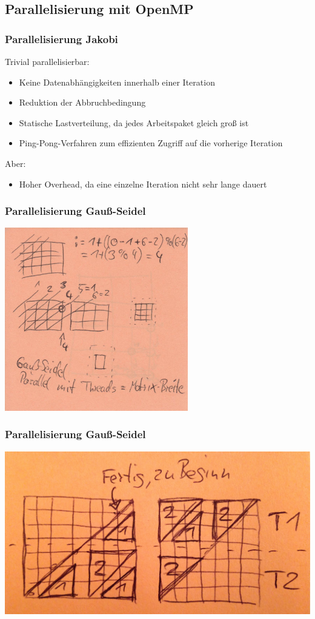 \documentclass{beamer}
\begin{document}
\subsection{Parallelisierung mit OpenMP}
\begin{frame}
    \frametitle{Parallelisierung Jakobi}
    Trivial parallelisierbar:
    \begin{itemize}
        \item Keine Datenabhängigkeiten innerhalb einer Iteration
        \item Reduktion der Abbruchbedingung
        \item Statische Lastverteilung, da jedes Arbeitspaket gleich groß ist
        \item Ping-Pong-Verfahren zum effizienten Zugriff auf die vorherige Iteration
    \end{itemize}
    Aber:
    \begin{itemize}
        \item Hoher Overhead, da eine einzelne Iteration nicht sehr lange dauert
    \end{itemize}
\end{frame}

\begin{frame}
    \frametitle{Parallelisierung Gauß-Seidel}
    \includegraphics[width=0.6\textwidth]{gaussseidelskizze}
\end{frame}

\begin{frame}
    \frametitle{Parallelisierung Gauß-Seidel}
    \includegraphics[width=\textwidth]{gaussseideldreiecke}
\end{frame}
\end{document}
